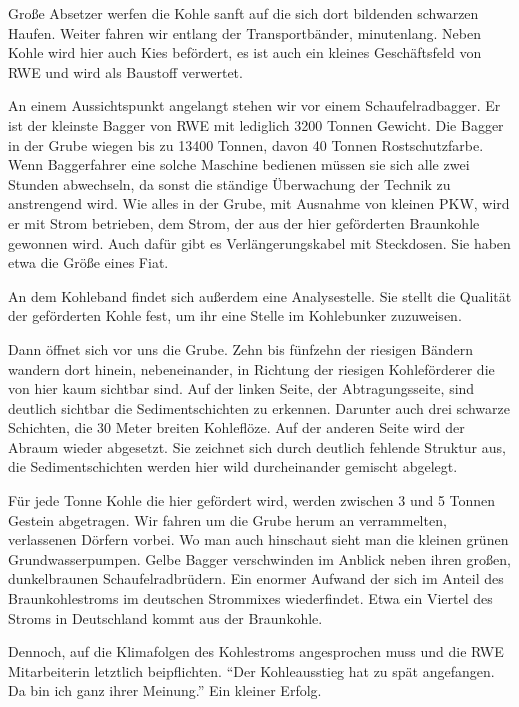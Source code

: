 \documentclass{article}
\begin{document}
Große Absetzer werfen die Kohle sanft auf die sich dort bildenden schwarzen Haufen.
Weiter fahren wir entlang der Transportbänder, minutenlang.
Neben Kohle wird hier auch Kies befördert, es ist auch ein kleines Geschäftsfeld von RWE
und wird als Baustoff verwertet.

An einem Aussichtspunkt angelangt stehen wir vor einem Schaufelradbagger.
Er ist der kleinste Bagger von RWE mit lediglich 3200 Tonnen Gewicht.
Die Bagger in der Grube wiegen bis zu 13400 Tonnen, davon 40 Tonnen Rostschutzfarbe.
Wenn Baggerfahrer eine solche Maschine bedienen müssen sie sich alle zwei Stunden abwechseln,
da sonst die ständige Überwachung der Technik zu anstrengend wird.
Wie alles in der Grube, mit Ausnahme von kleinen PKW, wird er mit Strom betrieben,
dem Strom, der aus der hier geförderten Braunkohle gewonnen wird.
Auch dafür gibt es Verlängerungskabel mit Steckdosen.
Sie haben etwa die Größe eines Fiat.

An dem Kohleband findet sich außerdem eine Analysestelle.
Sie stellt die Qualität der geförderten Kohle fest, um ihr eine Stelle im Kohlebunker
zuzuweisen.

Dann öffnet sich vor uns die Grube. Zehn bis fünfzehn der riesigen Bändern
wandern dort hinein, nebeneinander, in Richtung der riesigen Kohleförderer die von
hier kaum sichtbar sind.
Auf der linken Seite, der Abtragungsseite, sind deutlich sichtbar die Sedimentschichten
zu erkennen.
Darunter auch drei schwarze Schichten, die 30 Meter breiten Kohleflöze.
Auf der anderen Seite wird der Abraum wieder abgesetzt.
Sie zeichnet sich durch deutlich fehlende Struktur aus,
die Sedimentschichten werden hier wild durcheinander gemischt abgelegt.

Für jede Tonne Kohle die hier gefördert wird, werden zwischen 3 und 5 Tonnen Gestein
abgetragen.
Wir fahren um die Grube herum an verrammelten, verlassenen Dörfern vorbei.
Wo man auch hinschaut sieht man die kleinen grünen Grundwasserpumpen.
Gelbe Bagger verschwinden im Anblick neben ihren großen, dunkelbraunen Schaufelradbrüdern.
Ein enormer Aufwand der sich im Anteil des Braunkohlestroms im deutschen Strommixes wiederfindet.
Etwa ein Viertel des Stroms in Deutschland kommt aus der Braunkohle.

Dennoch, auf die Klimafolgen des Kohlestroms angesprochen muss und die RWE Mitarbeiterin letztlich beipflichten.
\enquote{Der Kohleausstieg hat zu spät angefangen. Da bin ich ganz ihrer Meinung.}
Ein kleiner Erfolg.
\end{document}
